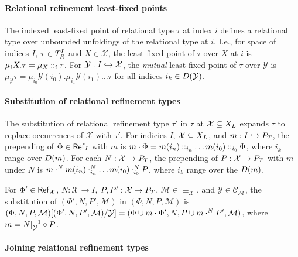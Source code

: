 \paragraph{Relational refinement least-fixed points}
The indexed least-fixed point of relational type $\tau$ at index $i$
defines a relational type over unbounded unfoldings of the relational
type at $i$.
%
I.e., for space of indices $I$, $\tau \in T_{R}^{I}$ and
$X \in \mathcal{X}$, the least-fixed point of $\tau$ over $X$ at $i$
is $\mu_i X. \tau = %
\mu_X \prepend{i} \tau$.
%
For $\mathcal{Y} : I \hookrightarrow \mathcal{X}$, the \emph{mutual} least
fixed point of $\tau$ over $\mathcal{Y}$ is
$\mu_\mathcal{Y} \tau = \mu_{i_0} \mathcal{Y}(i_0). \mu_{i_1}
\mathcal{Y}(i_1) \ldots \tau$ for all indices
$i_k \in D(\mathcal{Y})$.

\paragraph{Substitution of relational refinement types}
%
The substitution of relational refinement type $\tau'$ in $\tau$ at
$\mathcal{X} \subseteq X_L$ expands $\tau$ to replace occurrences
of $\mathcal{X}$ with $\tau'$.
%
For indicies $I$, $\mathcal{X} \subseteq X_L$, and %
$m : I \hookrightarrow P_T$, the prepending of $\Phi \in \mathsf{Ref}_{ I }$
with $m$ is
$m \cdot \Phi = m(i_n) \mathbin{::}_{i_n} \ldots m(i_0) \mathbin{::}_{i_0}
\Phi$, where $i_k$ range over $D(m)$.
%
For each $N : \mathcal{X} \to P_T$, the prepending of
$P : \mathcal{X} \to P_T$ with $m$ under $N$ is
$m \cdot^N m(i_n) \cdot_{i_n}^{N} \ldots m(i_0)
\cdot_{i_0}^{N} P$, where $i_k$ range over the $D(m)$.

For $\Phi' \in \mathsf{Ref}_{ \mathcal{X} }$, %
$N : \mathcal{X} \to I$, %
$P, P' : \mathcal{X} \to P_T$, %
$\mathcal{M} \in \equiv_{\mathcal{X}}$, and %
$\mathcal{Y} \in \mathcal{C}_{\mathcal{M}}$, the substitution of
$(\Phi', N, P', \mathcal{M})$ in $(\Phi, N, P, \mathcal{M})$ is %
$\replace{ (\Phi, N, P, \mathcal{M}) }{ \mathcal{Y} }{ %
  (\Phi', N, P', \mathcal{M}) } = %
(\Phi \union m \concat \Phi', N, %
P \union m \concat^N P', \mathcal{M})$, where
$m = N|_{ \mathcal{Y} } ^{-1} \circ P$.


\paragraph{Joining relational refinement types}


